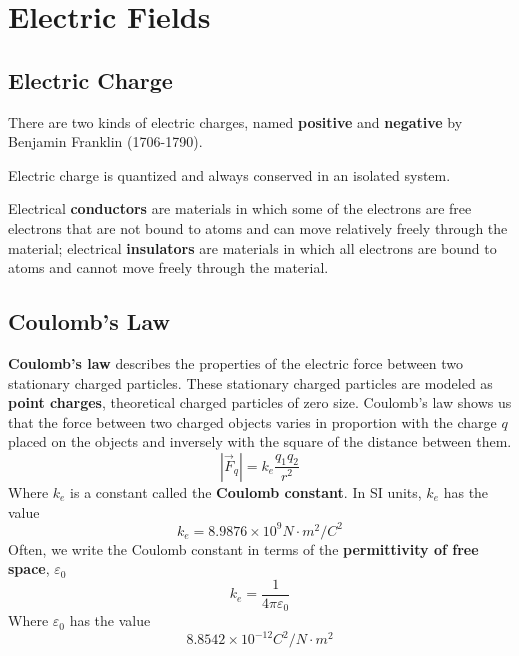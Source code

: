 \chapter{Electric Fields}


\section{Electric Charge}

There are two kinds of electric charges, named \textbf{positive} and
\textbf{negative} by Benjamin Franklin (1706-1790)\cite[p.~643]{serway}.

Electric charge is quantized and always conserved in an isolated system.

Electrical \textbf{conductors} are materials in which some of the electrons are
free electrons that are not bound to atoms and can move relatively freely
through the material; electrical \textbf{insulators} are materials in which all
electrons are bound to atoms and cannot move freely through the
material.\cite[p.~644]{serway}


\section{Coulomb's Law}

\textbf{Coulomb's law} describes the properties of the electric force between two
stationary charged particles. These stationary charged particles are modeled as
\textbf{point charges}, theoretical charged particles of zero size. Coulomb's
law shows us that the force between two charged objects varies in
proportion with the charge $q$ placed on the objects and inversely with the
square of the distance between them.
\begin{equation}
  \label{eq:coulombslaw}
  |\vec{F}_q|=k_e\frac{q_1q_2}{r^2}
\end{equation}
Where $k_e$ is a constant called the \textbf{Coulomb constant}. In SI units, $k_e$ has the value
\begin{equation}
  \label{coulombconstant}
  k_e = 8.9876 \times 10^9 N \cdot m^2 / C^2 
\end{equation}
Often, we write the Coulomb constant in terms of the \textbf{permittivity of
free space}, $\varepsilon_0$
\begin{equation}
  k_e = \frac{1}{4 \pi \varepsilon_0}
\end{equation}
Where $\varepsilon_0$ has the value
\begin{equation}
  8.8542 \times 10^{-12} C^2 / N \cdot m^2
\end{equation}


